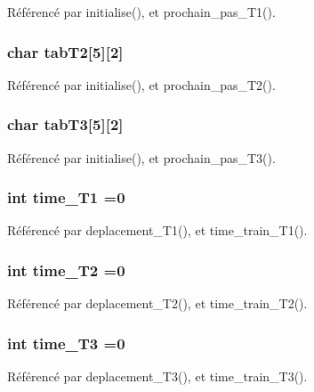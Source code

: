 Référencé par initialise(), et prochain\+\_\+pas\+\_\+\+T1().

\subsubsection[{tab\+T2}]{\setlength{\rightskip}{0pt plus 5cm}char tab\+T2[5][2]}\label{thread_8h_a937f8a083d2eb0ddf332cf0e0eaf6a9b}


Référencé par initialise(), et prochain\+\_\+pas\+\_\+\+T2().

\subsubsection[{tab\+T3}]{\setlength{\rightskip}{0pt plus 5cm}char tab\+T3[5][2]}\label{thread_8h_aa09683f54909b8bde1c6be7b09283531}


Référencé par initialise(), et prochain\+\_\+pas\+\_\+\+T3().

\subsubsection[{time\+\_\+\+T1}]{\setlength{\rightskip}{0pt plus 5cm}int time\+\_\+\+T1 =0}\label{thread_8h_afbbe5c8bda3844141662fc6b4a61c041}


Référencé par deplacement\+\_\+\+T1(), et time\+\_\+train\+\_\+\+T1().

\subsubsection[{time\+\_\+\+T2}]{\setlength{\rightskip}{0pt plus 5cm}int time\+\_\+\+T2 =0}\label{thread_8h_abfd7eef7b196e27888a949f66e4a20a8}


Référencé par deplacement\+\_\+\+T2(), et time\+\_\+train\+\_\+\+T2().

\subsubsection[{time\+\_\+\+T3}]{\setlength{\rightskip}{0pt plus 5cm}int time\+\_\+\+T3 =0}\label{thread_8h_a1c1f57fea3191ead973c49e64e089547}


Référencé par deplacement\+\_\+\+T3(), et time\+\_\+train\+\_\+\+T3().

